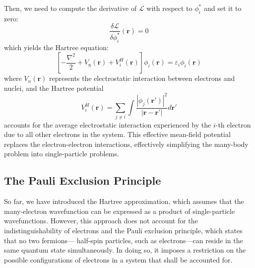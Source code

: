 Then, we need to compute the derivative of $\mathcal{L}$ with respect to $\phi_i^*$ and set it to zero:
\begin{equation}
  \label{eq26}
  \frac{\delta \mathcal{L}}{\delta \phi_i^*}(\mathbf{r}) = 0
\end{equation}
which yields the Hartree equation:
\begin{equation}
  \label{eq27}
  \left[-\frac{\nabla^2}{2} + V_{\text{n}}(\mathbf{r}) + V^H_i(\mathbf{r})\right]\phi_i(\mathbf{r})  = \varepsilon_i \phi_i(\mathbf{r})
\end{equation}
where $V_n(\mathbf{r})$ represents the electrostatic interaction between electrons and nuclei, and the Hartree potential 
\begin{equation}
  \label{eq28}
  V^H_i(\mathbf{r}) = \sum_{j\neq i} \int \frac{|\phi_j(\mathbf{r'})|^2}{|\mathbf{r} - \mathbf{r'}|} d\mathbf{r'}
\end{equation}
accounts for the average electrostatic interaction experienced by the $i$-th electron due to all other electrons in the system. This effective mean-field potential replaces the electron-electron interactions, effectively simplifying the many-body problem into single-particle problems. 
\subsection{The Pauli Exclusion Principle}
So far, we have introduced the Hartree approximation, which assumes that the many-electron wavefunction can be expressed as a product of single-particle wavefunctions. However, this approach does not account for the indistinguishability of electrons and the Pauli exclusion principle, which states that no two fermions--- half-spin particles, such as electrons---can reside in the same quantum state simultaneously. In doing so, it imposes a restriction on the possible configurations of electrons in a system that shall be accounted for.
 
